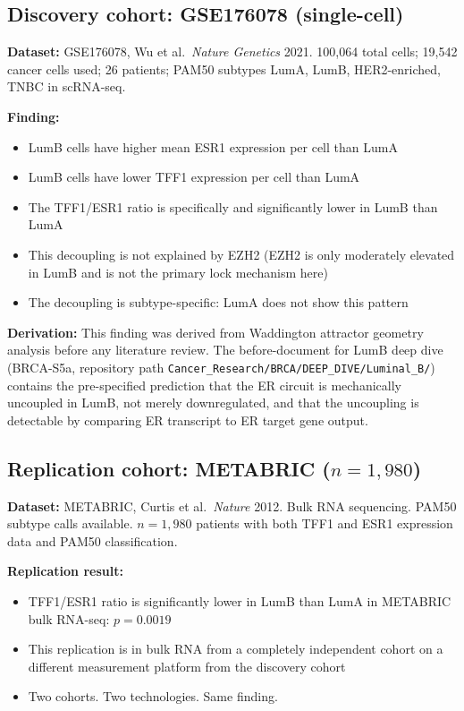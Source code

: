 \documentclass[12pt, a4paper]{article}
\begin{document}
\subsection{Discovery cohort: GSE176078 (single-cell)}

\noindent
\textbf{Dataset:} GSE176078, Wu et al.\ \textit{Nature
Genetics} 2021. 100,064 total cells; 19,542 cancer
cells used; 26 patients; PAM50 subtypes
LumA, LumB, HER2-enriched, TNBC in scRNA-seq.

\medskip
\noindent
\textbf{Finding:}
\begin{itemize}[noitemsep]
  \item LumB cells have higher mean ESR1 expression
        per cell than LumA
  \item LumB cells have lower TFF1 expression per
        cell than LumA
  \item The TFF1/ESR1 ratio is specifically and
        significantly lower in LumB than LumA
  \item This decoupling is not explained by EZH2
        (EZH2 is only moderately elevated in LumB
        and is not the primary lock mechanism here)
  \item The decoupling is subtype-specific: LumA
        does not show this pattern
\end{itemize}

\noindent
\textbf{Derivation:} This finding was derived from
Waddington attractor geometry analysis before any
literature review. The before-document for LumB
deep dive (BRCA-S5a, repository path
\texttt{Cancer\_Research/BRCA/DEEP\_DIVE/Luminal\_B/})
contains the pre-specified prediction that the ER
circuit is mechanically uncoupled in LumB, not merely
downregulated, and that the uncoupling is detectable
by comparing ER transcript to ER target gene output.

\subsection{Replication cohort: METABRIC ($n=1{,}980$)}

\noindent
\textbf{Dataset:} METABRIC, Curtis et al.\
\textit{Nature} 2012. Bulk RNA sequencing.
PAM50 subtype calls available. $n=1{,}980$ patients
with both TFF1 and ESR1 expression data and PAM50
classification.

\medskip
\noindent
\textbf{Replication result:}
\begin{itemize}[noitemsep]
  \item TFF1/ESR1 ratio is significantly lower in
        LumB than LumA in METABRIC bulk RNA-seq:
        $p=0.0019$
  \item This replication is in bulk RNA from a
        completely independent cohort on a different
        measurement platform from the discovery cohort
  \item Two cohorts. Two technologies. Same finding.
\end{itemize}
\end{document}
